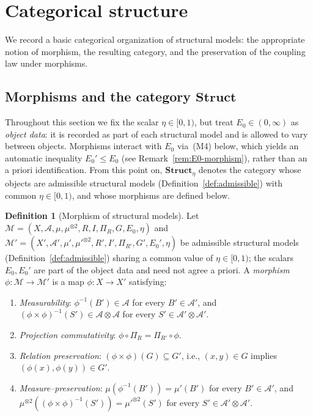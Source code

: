 \documentclass[11pt]{article}
\numberwithin{equation}{section}
\theoremstyle{definition}
\newtheorem{definition}[theorem]{Definition}
\begin{document}

\section{Categorical structure}\label{sec:category}

We record a basic categorical organization of structural models: the appropriate notion of morphism, the resulting category, and the preservation of the coupling law under morphisms.

\subsection{\texorpdfstring{Morphisms and the category $\mathbf{Struct}$}{Morphisms and the category Struct}}

Throughout this section we fix the scalar $\eta\in[0,1)$, but treat $E_0\in(0,\infty)$ as \emph{object data}: it is recorded as part of each structural model and is allowed to vary between objects. Morphisms interact with $E_0$ via~(M4) below, which yields an automatic inequality $E_0'\le E_0$ (see Remark~\ref{rem:E0-morphism}), rather than an a priori identification. From this point on, $\mathbf{Struct}_{\eta}$ denotes the category whose objects are admissible structural models (Definition~\ref{def:admissible}) with common $\eta\in[0,1)$, and whose morphisms are defined below.

\begin{definition}[Morphism of structural models]\label{def:morphism}
Let $\mathcal M=(X,\allowbreak\mathcal A,\allowbreak\mu,\allowbreak\mu^{\otimes2},\allowbreak R,\allowbreak I,\allowbreak\Pi_R,\allowbreak G,\allowbreak E_0,\allowbreak\eta)$ and $\mathcal M'=(X',\allowbreak\mathcal A',\allowbreak\mu',\allowbreak\mu'^{\otimes2},\allowbreak R',\allowbreak I',\allowbreak\Pi_{R'},\allowbreak G',\allowbreak E_0',\allowbreak\eta)$ be admissible structural models (Definition~\ref{def:admissible}) sharing a common value of $\eta\in[0,1)$; the scalars $E_0,E_0'$ are part of the object data and need not agree a priori. A \emph{morphism} $\phi:\mathcal M\to\mathcal M'$ is a map $\phi:X\to X'$ satisfying:
\begin{enumerate}[label=\emph{(M\arabic*)},nosep,leftmargin=2.5em]
\item \emph{Measurability}: $\phi^{-1}(B')\in\mathcal A$ for every $B'\in\mathcal A'$, and $(\phi\times\phi)^{-1}(S')\in\mathcal A\otimes\mathcal A$ for every $S'\in\mathcal A'\otimes\mathcal A'$.
\item \emph{Projection commutativity}: $\phi\circ\Pi_R=\Pi_{R'}\circ\phi$.
\item \emph{Relation preservation}: $(\phi\times\phi)(G)\subseteq G'$, i.e., $(x,y)\in G$ implies $(\phi(x),\phi(y))\in G'$.
\item \emph{Measure--preservation}: $\mu(\phi^{-1}(B'))=\mu'(B')$ for every $B'\in\mathcal A'$, and $\mu^{\otimes2}((\phi\times\phi)^{-1}(S'))=\mu'^{\otimes2}(S')$ for every $S'\in\mathcal A'\otimes\mathcal A'$.
\end{enumerate}
\end{definition}
\end{document}
